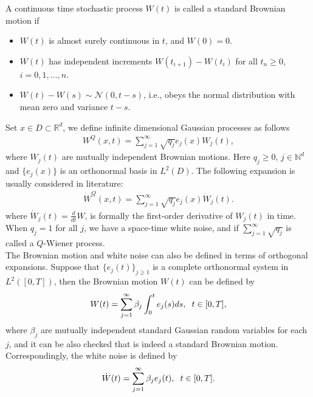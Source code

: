 	\begin{definition}
		\label{brownian_motion}
		 A continuous time stochastic process $W(t)$ is called a standard Brownian motion if
		\begin{itemize}
			\item
			$W(t)$ is almost surely continuous in $t$, and $W(0) = 0$. 
			\item
			$W(t)$ has independent increments $W(t_{i+1}) - W(t_i)$ for all $t_n \geq 0$, $i = 0, 1, \dots, n$.
			\item
			$W(t) - W(s) \sim \mathcal{N} (0, t-s)$, i.e., obeys the normal distribution with mean zero and variance $t - s$.
		\end{itemize}	
	\end{definition}

	\noindent Set $x \in D \subset \mathbb{R}^d$, we define infinite dimensional Gaussian processes as follows
	\begin{align*}
		W^Q (x, t) = \displaystyle \sum^{\infty}_{j = 1} \sqrt{q_j} e_j (x) W_j (t),
	\end{align*}
	where $W_j (t)$ are mutually independent Brownian motions. Here $q_j \geq 0$, $j \in \mathbb{N}^d$ and $\{ e_j (x) \}$ is an orthonormal basis in $L^2 (D)$.  The following expansion is usually considered in literature:
	\begin{align*}
		\dot{W}^Q (x, t) = \displaystyle \sum^{\infty}_{j = 1} \sqrt{q_j} e_j (x) \dot{W}_j (t).
	\end{align*}
	where $\dot{W}_j (t) =\frac{d}{dt} W$, is formally the first-order derivative of $W_j (t)$ in time. When $q_j = 1$ for all $j$, we have a space-time white noise, and if $\sum^{\infty}_{j = 1} \sqrt{q_j}$ is called a $Q$-Wiener process. \\

	\noindent The Brownian motion and white noise can also be defined in terms of orthogonal expansions. Suppose that $\{e_j (t)\}_{j \geq 1}$ is a complete orthonormal system in $L^2 ([0, T ])$, then the Brownian motion $W(t)$ can be defined by
	\begin{align}
	    W(t) = \displaystyle \sum_{j=1}^{\infty} \beta_j \int_{0}^{t} e_j (s) ds, \hspace{2mm} t \in [0, T],
	\end{align}
	where $\beta_j$ are mutually independent standard Gaussian random variables for each $j$, and it can be also checked that is indeed a standard Brownian motion. Correspondingly, the white noise is defined by
	\begin{align}
	    \dot{W}(t) = \displaystyle \sum_{j=1}^{\infty} \beta_j e_j (t), \hspace{2mm} t \in [0, T].
    \end{align}

